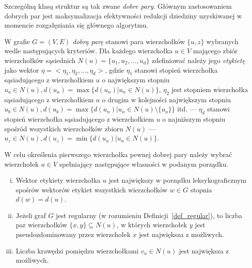 \par{
  Szczególną klasą struktur są tak zwane \emph{dobre pary}.
  Głównym zastosowaniem dobrych par jest maksymalizacja efektywności redukcji dziedziny uzyskiwanej w momencie rozgałęziania się głównego algorytmu.
  \begin{definition}
    W grafie $G=(V, E)$ \emph{dobrą parę} stanowi para wierzchołków $\{u, z\}$ wybranych wedle następujących kryteriów.
    Dla każdego wierzchołka $u \in V$ mającego zbiór wierzchołków sąsiednich $N(u)=\{u_1, u_2, \ldots, u_d\}$ zdefiniować należy jego \emph{etykietę} jako wektor $\eta=<\eta_1, \eta_2, \ldots, \eta_d>$, gdzie $\eta_1$ stanowi stopień wierzchołka sąsiadującego z wierzchołkiem $u$ o największym stopniu $u_{a} \in N(u), d(u_{a})=\max\{d(u_n) | u_n \in N(u)\}$, $\eta_2$ jest stopniem wierzchołka sąsiadującego z wierzchołkiem $u$ o drugim w kolejności największym stopniu $u_{b} \in N(u), d(u_{b})=\max\{d(u_n) | u_n \in N(u) \setminus \{u_{a}\}\}$ itd. --- $\eta_d$ stanowi stopień wierzchołka sąsiadującego z wierzchołkiem $u$ o najniższym stopniu spośród wszystkich wierzchołków zbioru $N(u)$ --- $u_{z} \in N(u), d(u_{z})=\min\{d(u_n) | u_n \in N(u)\}$.

    W celu określenia pierwszego wierzchołka pewnej dobrej pary należy wybrać wierzchołek $u \in V$ spełniający następujące własności w podanym porządku.
    \begin{enumerate}[(i)]
      \item Wektor etykiety wierzchołka $u$ jest największy w porządku leksykograficznym spośrów wektorów etykiet wszystkich wierzchołków $w \in G$ stopnia $d(w)=d(u)$.
      \item  Jeżeli graf $G$ jest regularny (w rozumieniu Definicji~\ref{def_regular}), to liczba par wierzchołków $\{x, y\} \subseteq N(u)$, w których wierzchołek $y$ jest pseudozdominowany przez wierzchołek $x$ jest największa z możliwych.
      \item Liczba krawędzi pomiędzu wierzchołkami $v_u \in N(u)$ jest największa z możliwych.
    \end{enumerate}


\end{definition}}
